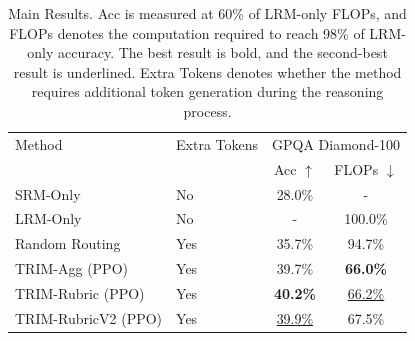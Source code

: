 \begin{table}[t]
\centering
\small
\begin{tabular}{llcc}
\toprule
Method & Extra Tokens & \multicolumn{2}{c}{GPQA Diamond-100} &  \\
 &  & Acc $\uparrow$ & FLOPs $\downarrow$ \\
\midrule
SRM-Only & No & 28.0\% & - \\
LRM-Only & No & - & 100.0\% \\
Random Routing & Yes & 35.7\% & 94.7\% \\
TRIM-Agg (PPO) & Yes & 39.7\% & \textbf{66.0\%} \\
TRIM-Rubric (PPO) & Yes & \textbf{40.2\%} & \underline{66.2\%} \\
TRIM-RubricV2 (PPO) & Yes & \underline{39.9\%} & 67.5\% \\
\bottomrule
\end{tabular}
\caption{Main Results. Acc is measured at 60\% of LRM-only FLOPs, and FLOPs denotes the computation required to reach 98\% of LRM-only accuracy. The best result is bold, and the second-best result is underlined. Extra Tokens denotes whether the method requires additional token generation during the reasoning process.}
\end{table}
